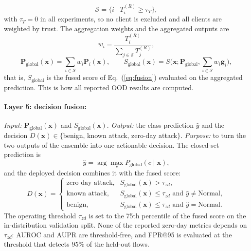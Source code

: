 \documentclass[pdflatex,sn-mathphys-num]{sn-jnl}
\newcommand{\Rtwo}{\color{blue}}
\begin{document}
{\begin{equation}
\mathcal{S}=\{i\mid T_i^{(R)}\geq\tau_T\},\label{eq:select}
\end{equation}
with $\tau_T=0$ in all experiments, so no client is excluded and all clients are weighted by trust. The aggregation weights and the aggregated outputs are
\begin{equation}
w_i=\frac{T_i^{(R)}}{\sum_{j\in\mathcal{S}}T_j^{(R)}},\label{eq:weights}
\end{equation}
\begin{equation}
\mathbf{P}_{\mathrm{global}}(\mathbf{x})=\sum_{i\in\mathcal{S}}w_i\mathbf{P}_i(\mathbf{x}),\qquad S_{\mathrm{global}}(\mathbf{x})=S\big(\mathbf{x};\mathbf{P}_{\mathrm{global}},\textstyle\sum_{i\in\mathcal{S}}w_i\mathbf{g}_i\big),\label{eq:global}
\end{equation}
that is, $S_{\mathrm{global}}$ is the fused score of Eq.~(\ref{eq:fusion}) evaluated on the aggregated prediction. This is how all reported OOD results are computed.
{\color{black}
\paragraph{Layer 5: decision fusion:} \emph{Input:} $\mathbf{P}_{\mathrm{global}}(\mathbf{x})$ and $S_{\mathrm{global}}(\mathbf{x})$. \emph{Output:} the class prediction $\hat y$ and the decision $D(\mathbf{x})\in\{$benign, known attack, zero-day attack$\}$. \emph{Purpose:} to turn the two outputs of the ensemble into one actionable decision. The closed-set prediction is
\begin{equation}
\hat y=\arg\max_c P_{\mathrm{global}}(c\mid\mathbf{x}),\label{eq:argmax}
\end{equation}
and the deployed decision combines it with the fused score:
\begin{equation}
D(\mathbf{x})=\begin{cases}\text{zero-day attack}, & S_{\mathrm{global}}(\mathbf{x})>\tau_{zd},\\ \text{known attack}, & S_{\mathrm{global}}(\mathbf{x})\leq\tau_{zd}\text{ and }\hat y\neq\text{Normal},\\ \text{benign}, & S_{\mathrm{global}}(\mathbf{x})\leq\tau_{zd}\text{ and }\hat y=\text{Normal}.\end{cases}\label{eq:decision}
\end{equation}
The operating threshold $\tau_{zd}$ is set to the 75th percentile of the fused score on the in-distribution validation split. {\Rtwo None of the reported zero-day metrics depends on $\tau_{zd}$: AUROC and AUPR are threshold-free, and FPR@95 is evaluated at the threshold that detects 95\% of the held-out flows.}

}}
\end{document}
